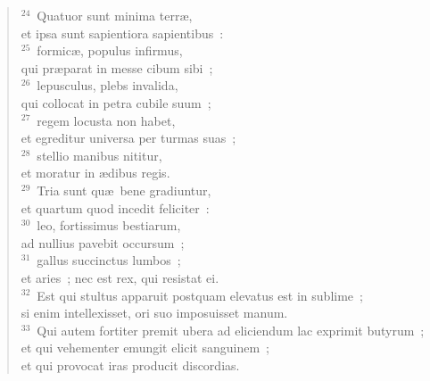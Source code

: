 \begin{flushleft}\begin{verse}${}^{24}$~Quatuor sunt minima terr\ae ,\\ et ipsa sunt sapientiora sapientibus~:\\
${}^{25}$~formic\ae , populus infirmus,\\ qui pr\ae parat in messe cibum sibi~;\\
${}^{26}$~lepusculus, plebs invalida,\\ qui collocat in petra cubile suum~;\\
${}^{27}$~regem locusta non habet,\\ et egreditur universa per turmas suas~;\\
${}^{28}$~stellio manibus nititur,\\ et moratur in \ae dibus regis.\\
${}^{29}$~Tria sunt qu\ae\ bene gradiuntur,\\ et quartum quod incedit feliciter~:\\
${}^{30}$~leo, fortissimus bestiarum,\\ ad nullius pavebit occursum~;\\
${}^{31}$~gallus succinctus lumbos~;\\ et aries~; nec est rex, qui resistat ei.\\
${}^{32}$~Est qui stultus apparuit postquam elevatus est in sublime~;\\ si enim intellexisset, ori suo imposuisset manum.\\
${}^{33}$~Qui autem fortiter premit ubera ad eliciendum lac exprimit butyrum~;\\ et qui vehementer emungit elicit sanguinem~;\\ et qui provocat iras producit discordias.\end{verse}\end{flushleft}


